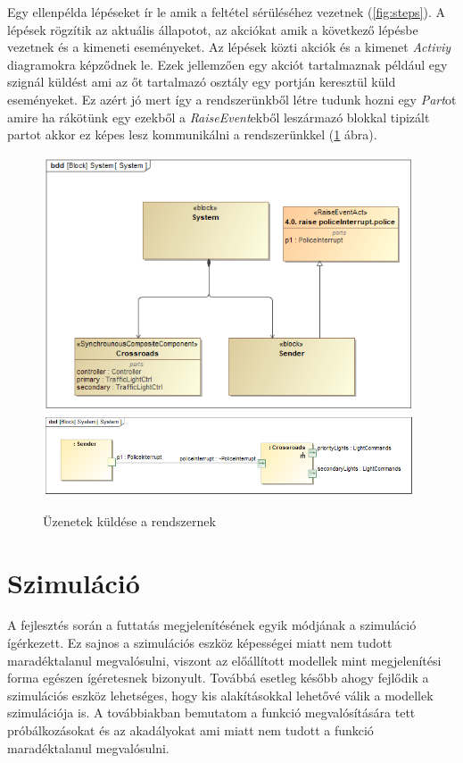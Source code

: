 Egy ellenpélda lépéseket ír le amik a feltétel sérüléséhez vezetnek (\ref{fig:steps}). A lépések rögzítik az aktuális állapotot, az akciókat amik a következő lépésbe vezetnek és a kimeneti eseményeket.
Az lépések közti akciók és a kimenet \emph{Activiy} diagramokra képződnek le. Ezek jellemzően egy akciót tartalmaznak például egy szignál küldést ami az őt tartalmazó osztály egy portján keresztül küld eseményeket. Ez azért jó mert így a rendszerünkből létre tudunk hozni egy \emph{Part}ot amire ha rákötünk egy ezekből a \emph{RaiseEvent}ekből leszármazó blokkal tipizált partot akkor ez képes lesz kommunikálni a rendszerünkkel (\ref{fig:trace-signals} ábra).

\begin{figure}[!ht]
	\centering
	\includegraphics[width=110mm, keepaspectratio]{figures/contribution/trace1.png}
	\includegraphics[width=110mm, keepaspectratio]{figures/contribution/trace2.png}
	\caption{Üzenetek küldése a rendszernek}
	\label{fig:trace-signals}
\end{figure}


\section{Szimuláció}

A fejlesztés során a futtatás megjelenítésének egyik módjának a szimuláció ígérkezett. Ez sajnos a szimulációs eszköz képességei miatt nem tudott maradéktalanul megvalósulni, viszont az előállított modellek mint megjelenítési forma egészen ígéretesnek bizonyult. Továbbá esetleg később ahogy fejlődik a szimulációs eszköz lehetséges, hogy kis alakításokkal lehetővé válik a modellek szimulációja is. A továbbiakban bemutatom a funkció megvalósítására tett próbálkozásokat és az akadályokat ami miatt nem tudott a funkció maradéktalanul megvalósulni.

